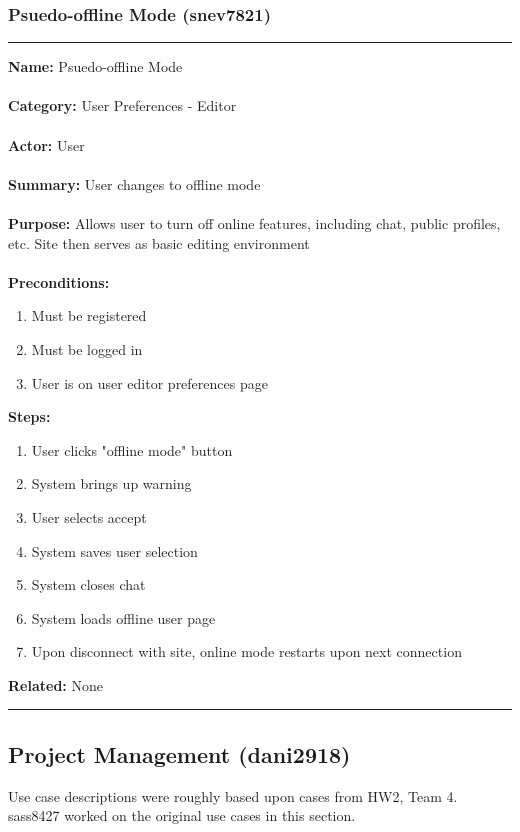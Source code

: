 \documentclass[11pt]{report}
\begin{document}
\subsubsection{Psuedo-offline Mode (snev7821)}
\vspace{2pt}
\hrule
\vspace{8pt}
	\noindent\textbf{Name:} Psuedo-offline Mode \\ \\
	\textbf{Category:} User Preferences - Editor  \\ \\
	\textbf{Actor:} User \\ \\
	\textbf{Summary:} User changes to offline mode \\ \\
	\textbf{Purpose:} Allows user to turn off online features, including chat, public profiles, etc. Site then serves as basic editing environment\\ \\
	\textbf{Preconditions:} 
	\begin{enumerate}
		\item Must be registered
		\item Must be logged in
		\item User is on user editor preferences page
	\end{enumerate}
	\textbf{Steps:}
	\begin{enumerate}
		\item User clicks "offline mode" button
		\item System brings up warning
		\item User selects accept
		\item System saves user selection
		\item System closes chat
		\item System loads offline user page
		\item Upon disconnect with site, online mode restarts upon next connection
	\end{enumerate}
	\textbf{Related:} None 
\vspace{8pt}
\hrule
\newpage

\subsection{Project Management (dani2918)}
Use case descriptions were roughly based upon cases from HW2, Team 4. sass8427 worked on the original use cases in this section.
\end{document}
